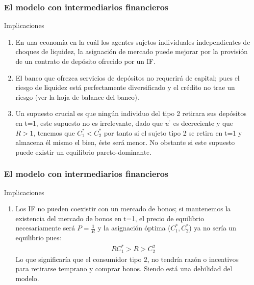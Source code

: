 \begin{frame}
    \frametitle{{\normalsize El modelo con intermediarios financieros } {}}
    
    \begin{block} {Implicaciones}
       \begin{enumerate}
           \item En una economía en la cuál los agentes sujetos individuales independientes de choques de liquidez, la asignación de mercado puede mejorar por la provisión de un contrato de depósito ofrecido por un IF.
           \item El banco que ofrezca servicios de depósitos no requerirá de capital; pues el riesgo de liquidez está perfectamente diversificado y el crédito no trae un riesgo (ver la hoja de balance del banco).
           \item Un supuesto crucial es que ningún individuo del tipo 2 retirara sus depósitos en t=1, este supuesto no es irrelevante, dado que $u^{'}$ es decreciente y que $R>1$, tenemos que $C_{1}^{*}<C_{2}^{*}$ por tanto si el sujeto tipo 2 se retira en t=1 y almacena él mismo el bien, éste será menor. No obstante si este supuesto puede existir un equilibrio pareto-dominante.
        \setcounter{enumTemp}{\theenumi}   
       \end{enumerate}
      
    \end{block}	
    
\end{frame}

\begin{frame}
    \frametitle{{\normalsize El modelo con intermediarios financieros } {}}
    
    \begin{block} {Implicaciones}
        \begin{enumerate}
            \setcounter{enumi}{\theenumTemp}
            \item Los IF no pueden coexistir con un mercado de bonos; si mantenemos la existencia del mercado de bonos en t=1, el precio de equilibrio necesariamente será $P=\frac{1}{R}$ y la asignación óptima ($C_{1}^{*}, C_{2}^{*}$)  ya no sería un equilibrio pues:
            \begin{align}
            RC_{1}^{*}>R>C_{2}^{2}\nonumber 
            \end{align}
            Lo que significaría que el consumidor tipo 2, no tendría razón o incentivos para retirarse temprano y comprar bonos. Siendo está una debilidad del modelo. 
        \end{enumerate}
        
    \end{block}	
    
\end{frame}

